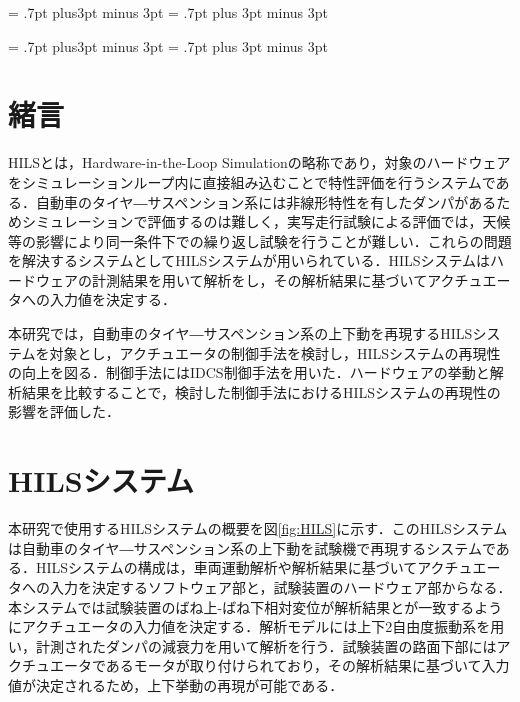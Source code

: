 \documentclass{article_vdlab_sotsuron_youshi}
\begin{document}
\kanjiskip = .7pt plus3pt minus 3pt
\xkanjiskip = .7pt plus 3pt minus 3pt
\small
{}

\setlength{\abovecaptionskip}{0mm}
\setlength{\belowcaptionskip}{0mm}
\setlength{\floatsep}{0mm}
\setlength{\textfloatsep}{0mm}
\setlength{\intextsep}{3mm}
\setlength{\dblfloatsep}{0mm}
\setlength{\dbltextfloatsep}{0mm}



\kanjiskip = .7pt plus3pt minus 3pt
\xkanjiskip = .7pt plus 3pt minus 3pt
\small
{}

\section{緒言}
HILSとは，Hardware-in-the-Loop Simulationの略称であり，対象のハードウェアをシミュレーションループ内に直接組み込むことで特性評価を行うシステムである．自動車のタイヤ―サスペンション系には非線形特性を有したダンパがあるためシミュレーションで評価するのは難しく，実写走行試験による評価では，天候等の影響により同一条件下での繰り返し試験を行うことが難しい．これらの問題を解決するシステムとしてHILSシステムが用いられている\cite{hils}．HILSシステムはハードウェアの計測結果を用いて解析をし，その解析結果に基づいてアクチュエータへの入力値を決定する．

本研究では，自動車のタイヤ―サスペンション系の上下動を再現するHILSシステムを対象とし，アクチュエータの制御手法を検討し，HILSシステムの再現性の向上を図る．制御手法にはIDCS制御手法を用いた．ハードウェアの挙動と解析結果を比較することで，検討した制御手法におけるHILSシステムの再現性の影響を評価した．

\vspace{4mm}
\section{HILSシステム}
本研究で使用するHILSシステムの概要を図\ref{fig:HILS}に示す．このHILSシステムは自動車のタイヤ―サスペンション系の上下動を試験機で再現するシステムである．HILSシステムの構成は，車両運動解析や解析結果に基づいてアクチュエータへの入力を決定するソフトウェア部と，試験装置のハードウェア部からなる．本システムでは試験装置のばね上-ばね下相対変位が解析結果とが一致するようにアクチュエータの入力値を決定する．解析モデルには上下2自由度振動系を用い，計測されたダンパの減衰力を用いて解析を行う．試験装置の路面下部にはアクチュエータであるモータが取り付けられており，その解析結果に基づいて入力値が決定されるため，上下挙動の再現が可能である．
\end{document}
